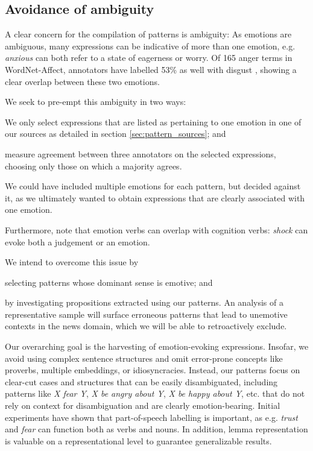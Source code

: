 \subsection{Avoidance of ambiguity}

A clear concern for the compilation of patterns is ambiguity: As emotions are ambiguous, many expressions can be indicative of more than one emotion, e.g. \textit{anxious} can both refer to a state of eagerness or worry. Of 165 anger terms in WordNet-Affect, annotators have labelled 53\% as well with disgust \cite{nrc}, showing a clear overlap between these two emotions.

We seek to pre-empt this ambiguity in two ways: \begin{inparaenum} \item We only select expressions that are listed as pertaining to one emotion in one of our sources as detailed in section \ref{sec:pattern_sources}; and \item measure agreement between three annotators on the selected expressions, choosing only those on which a majority agrees. \end{inparaenum} We could have included multiple emotions for each pattern, but decided against it, as we ultimately wanted to obtain expressions that are clearly associated with one emotion.

Furthermore, \citeauthor{emotion_verbs} note that emotion verbs can overlap with cognition verbs: \textit{shock} can evoke both a judgement or an emotion.\begin{inparaenum} We intend to overcome this issue by \item selecting patterns whose dominant sense is emotive; and \item by investigating propositions extracted using our patterns. An analysis of a representative sample will surface erroneous patterns that lead to unemotive contexts in the news domain, which we will be able to retroactively exclude. \end{inparaenum}

Our overarching goal is the harvesting of emotion-evoking expressions. Insofar, we avoid using complex sentence structures and omit error-prone concepts like proverbs, multiple embeddings, or idiosyncracies. Instead, our patterns focus on clear-cut cases and structures that can be easily disambiguated, including patterns like \textit{X fear Y}, \textit{X be angry about Y}, \textit{X be happy about Y}, etc. that do not rely on context for disambiguation and are clearly emotion-bearing. Initial experiments have shown that part-of-speech labelling is important, as e.g. \textit{trust} and \textit{fear} can function both as verbs and nouns. In addition, lemma representation is valuable on a representational level to guarantee generalizable results.

